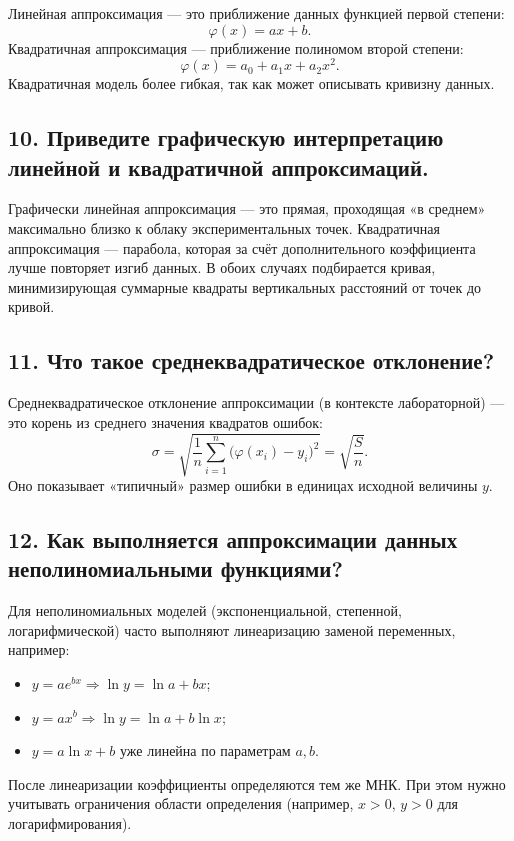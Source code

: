 \documentclass[a4paper,12pt]{article}
\begin{document}
Линейная аппроксимация --- это приближение данных функцией первой степени:
\[
\varphi(x)=ax+b.
\]
Квадратичная аппроксимация --- приближение полиномом второй степени:
\[
\varphi(x)=a_0+a_1x+a_2x^2.
\]
Квадратичная модель более гибкая, так как может описывать кривизну данных.

\subsection*{10. Приведите графическую интерпретацию линейной и квадратичной аппроксимаций.}

Графически линейная аппроксимация --- это прямая, проходящая «в среднем» максимально близко к облаку экспериментальных точек. Квадратичная аппроксимация --- парабола, которая за счёт дополнительного коэффициента лучше повторяет изгиб данных. В обоих случаях подбирается кривая, минимизирующая суммарные квадраты вертикальных расстояний от точек до кривой.

\subsection*{11. Что такое среднеквадратическое отклонение?}

Среднеквадратическое отклонение аппроксимации (в контексте лабораторной) --- это корень из среднего значения квадратов ошибок:
\[
\sigma = \sqrt{\frac{1}{n}\sum_{i=1}^{n}\bigl(\varphi(x_i)-y_i\bigr)^2} = \sqrt{\frac{S}{n}}.
\]
Оно показывает «типичный» размер ошибки в единицах исходной величины $y$.

\subsection*{12. Как выполняется аппроксимации данных неполиномиальными функциями?}

Для неполиномиальных моделей (экспоненциальной, степенной, логарифмической) часто выполняют линеаризацию заменой переменных, например:
\begin{itemize}
	\item $y=ae^{bx} \Rightarrow \ln y = \ln a + bx$;
	\item $y=ax^b \Rightarrow \ln y = \ln a + b\ln x$;
	\item $y=a\ln x + b$ уже линейна по параметрам $a,b$.
\end{itemize}
После линеаризации коэффициенты определяются тем же МНК. При этом нужно учитывать ограничения области определения (например, $x>0$, $y>0$ для логарифмирования).
\end{document}
